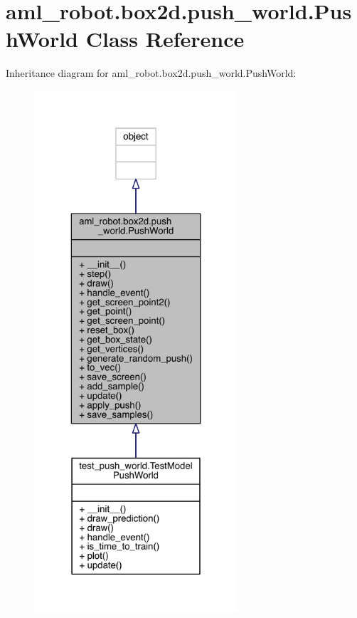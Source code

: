 \hypertarget{classaml__robot_1_1box2d_1_1push__world_1_1_push_world}{}\section{aml\+\_\+robot.\+box2d.\+push\+\_\+world.\+Push\+World Class Reference}
\label{classaml__robot_1_1box2d_1_1push__world_1_1_push_world}


Inheritance diagram for aml\+\_\+robot.\+box2d.\+push\+\_\+world.\+Push\+World\+:\nopagebreak
\begin{figure}[H]
\begin{center}
\leavevmode
\includegraphics[height=550pt]{classaml__robot_1_1box2d_1_1push__world_1_1_push_world__inherit__graph}
\end{center}
\end{figure}


